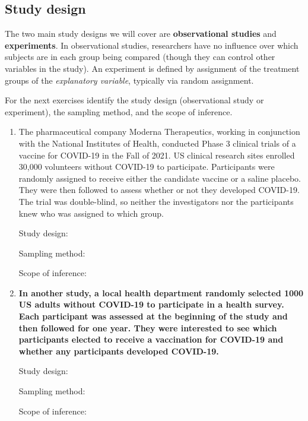 \documentclass[
]{report}
\begin{document}
\hypertarget{study-design-2}{%
\subsection{Study design}\label{study-design-2}}

The two main study designs we will cover are \textbf{observational studies} and \textbf{experiments}. In observational studies, researchers have no influence over which subjects are in each group being compared (though they can control other variables in the study). An experiment is defined by assignment of the treatment groups of the \emph{explanatory variable}, typically via random assignment.

For the next exercises identify the study design (observational study or experiment), the sampling method, and the scope of inference.

\begin{enumerate}
\def\labelenumi{\arabic{enumi}.}
\setcounter{enumi}{14}
\item
  The pharmaceutical company Moderna Therapeutics, working in conjunction with the National Institutes of Health, conducted Phase 3 clinical trials of a vaccine for COVID-19 in the Fall of 2021. US clinical research sites enrolled 30,000 volunteers without COVID-19 to participate. Participants were randomly assigned to receive either the candidate vaccine or a saline placebo. They were then followed to assess whether or not they developed COVID-19. The trial was double-blind, so neither the investigators nor the participants knew who was assigned to which group.
  \vspace{0.1in}

  Study design:
  \vspace{0.3in}

  Sampling method:
  \vspace{0.3in}

  Scope of inference:
  \newpage
\item
  \textbf{In another study, a local health department randomly selected 1000 US adults without COVID-19 to participate in a health survey. Each participant was assessed at the beginning of the study and then followed for one year. They were interested to see which participants elected to receive a vaccination for COVID-19 and whether any participants developed COVID-19.}
  \vspace{0.1in}

  Study design:
  \vspace{0.3in}

  Sampling method:
  \vspace{0.3in}

  Scope of inference:
  \vspace{0.3in}
\end{enumerate}
\end{document}

